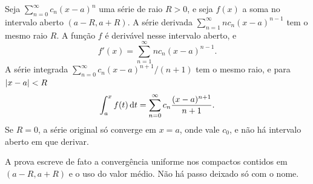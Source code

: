 \documentclass[11pt,a4paper]{article}
\begin{document}
\begin{teorema}
\label{thm:termo-a-termo}
Seja \(\sum_{n=0}^\infty c_n(x-a)^n\) uma série de raio \(R>0\), e seja \(f(x)\) a soma no intervalo aberto \((a-R,a+R)\). A série derivada \(\sum_{n=1}^\infty n c_n(x-a)^{n-1}\) tem o mesmo raio \(R\). A função \(f\) é derivável nesse intervalo aberto, e
\[
f'(x)=\sum_{n=1}^\infty n c_n(x-a)^{n-1}.
\]
A série integrada \(\sum_{n=0}^\infty c_n(x-a)^{n+1}/(n+1)\) tem o mesmo raio, e para \(\left\lvert x-a \right\rvert<R\)
\[
\int_a^x f(t)\,\mathrm{d} t=\sum_{n=0}^\infty c_n\frac{(x-a)^{n+1}}{n+1}.
\]
Se \(R=0\), a série original só converge em \(x=a\), onde vale \(c_0\), e não há intervalo aberto em que derivar.
\end{teorema}

A prova escreve de fato a convergência uniforme nos compactos contidos em \((a-R,a+R)\) e o uso do valor médio. Não há passo deixado só com o nome.
\end{document}
